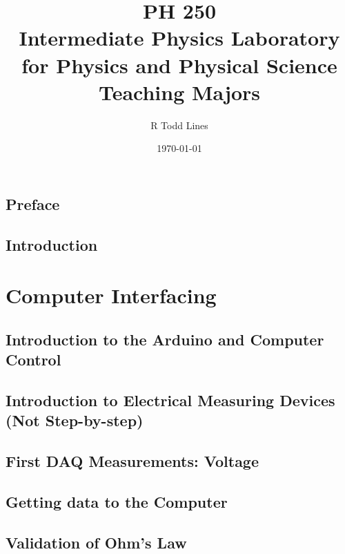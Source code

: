 \documentclass{book}
\begin{document}
\frontmatter
\title{{\Huge PH 250}\\
{\Huge {\Large Intermediate Physics Laboratory for Physics and Physical
Science Teaching Majors} }}
\author{R Todd Lines}
\date{\today}
\maketitle
\tableofcontents

\chapter*{Preface}
	


\chapter{Introduction}
	

\mainmatter

\part{Computer Interfacing}

	\chapter{Introduction to the Arduino and Computer Control}
		
	
	\chapter{Introduction to Electrical Measuring Devices (Not Step-by-step)}
		
	
	\chapter{First DAQ Measurements: Voltage}
		
	
	\chapter{Getting data to the Computer}
		
	
	\chapter{Validation of Ohm's Law}
		
\end{document}
